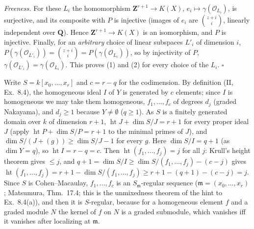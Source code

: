 \documentclass[11pt]{article}
\begin{document}
\emph{Freeness.} For these $L_i$ the homomorphism $\mathbf Z^{r+1}\to K(X)$, $e_i\mapsto\gamma(\mathcal O_{L_i})$, is surjective, and its composite with $P$ is injective (images of $e_i$ are $\binom{z+i}i$, linearly independent over $\mathbf Q$). Hence $\mathbf Z^{r+1}\to K(X)$ is an isomorphism, and $P$ is injective. Finally, for an \emph{arbitrary} choice of linear subspaces $L'_i$ of dimension $i$, $P(\gamma(\mathcal O_{L'_i}))=\binom{z+i}i=P(\gamma(\mathcal O_{L_i}))$, so by injectivity of $P$, $\gamma(\mathcal O_{L'_i})=\gamma(\mathcal O_{L_i})$. This proves (1) and (2) for every choice of the $L_i$. \hfill$\square$

\pf
Write $S=k[x_0,\dots,x_r]$ and $c=r-q$ for the codimension. By definition (II, Ex.~8.4), the homogeneous ideal $I$ of $Y$ is generated by $c$ elements; since $I$ is homogeneous we may take them homogeneous, $f_1,\dots,f_c$ of degrees $d_j$ (graded Nakayama), and $d_j\ge1$ because $Y\ne\emptyset$ ($q\ge1$). As $S$ is a finitely generated domain over $k$ of dimension $r+1$, $\operatorname{ht}J+\dim S/J=r+1$ for every proper ideal $J$ (apply $\operatorname{ht}P+\dim S/P=r+1$ to the minimal primes of $J$), and $\dim S/(J+(g))\ge\dim S/J-1$ for every $g$. Here $\dim S/I=q+1$ (as $\dim Y=q$), so $\operatorname{ht}I=r-q=c$. Then $\operatorname{ht}(f_1,\dots,f_j)=j$ for all $j$: Krull's height theorem gives $\le j$, and $q+1=\dim S/I\ge\dim S/(f_1,\dots,f_j)-(c-j)$ gives $\operatorname{ht}(f_1,\dots,f_j)=r+1-\dim S/(f_1,\dots,f_j)\ge r+1-(q+1)-(c-j)=j$. Since $S$ is Cohen--Macaulay, $f_1,\dots,f_c$ is an $S_{\mathfrak m}$-regular sequence ($\mathfrak m=(x_0,\dots,x_r)$; Matsumura, Thm.~17.4; this is the unmixedness theorem of the hint to Ex.~8.4(a)), and then it is $S$-regular, because for a homogeneous element $f$ and a graded module $N$ the kernel of $f$ on $N$ is a graded submodule, which vanishes iff it vanishes after localizing at $\mathfrak m$.
\end{document}
